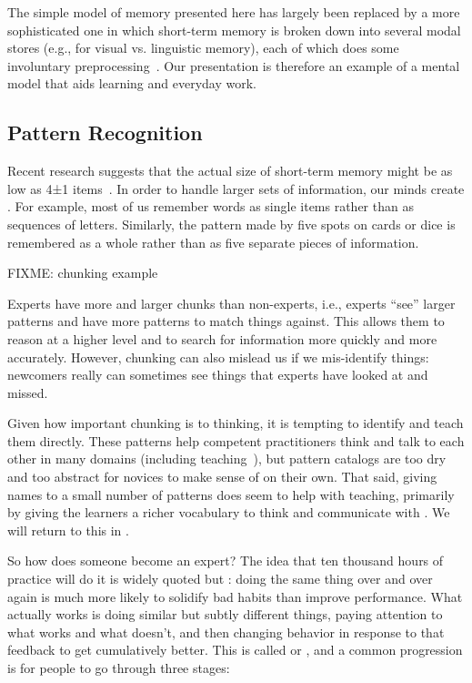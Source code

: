 The simple model of memory presented here has largely been replaced by a more sophisticated one
in which short-term memory is broken down into several modal stores
(e.g., for visual vs. linguistic memory),
each of which does some involuntary preprocessing~\cite{Mill2016a}.
Our presentation is therefore an example of a mental model that aids learning and everyday work.

\subsection*{Pattern Recognition}

Recent research suggests that the actual size of short-term memory
might be as low as 4±1 items~\cite{Dida2016}.
In order to handle larger sets of information,
our minds create .
For example,
most of us remember words as single items rather than as sequences of letters.
Similarly,
the pattern made by five spots on cards or dice is remembered as a whole
rather than as five separate pieces of information.

FIXME: chunking example

Experts have more and larger chunks than non-experts,
i.e., experts ``see'' larger patterns and have more patterns to match things against.
This allows them to reason at a higher level
and to search for information more quickly and more accurately.
However,
chunking can also mislead us if we mis-identify things:
newcomers really can sometimes see things that experts have looked at and missed.

Given how important chunking is to thinking,
it is tempting to identify 
and teach them directly.
These patterns help competent practitioners think and talk to each other in many domains (including teaching~\cite{Berg2012}),
but pattern catalogs are too dry and too abstract for novices to make sense of on their own.
That said,
giving names to a small number of patterns does seem to help with teaching,
primarily by giving the learners a richer vocabulary to think and communicate with \cite{Kuit2004,Byck2005,Saja2006}.
We will return to this in .


So how does someone become an expert?
The idea that ten thousand hours of practice will do it is widely quoted
but :
doing the same thing over and over again is much more likely to solidify bad habits than improve performance.
What actually works is doing similar but subtly different things,
paying attention to what works and what doesn't,
and then changing behavior in response to that feedback to get cumulatively better.
This is called 
or ,
and a common progression is for people to go through three stages:

